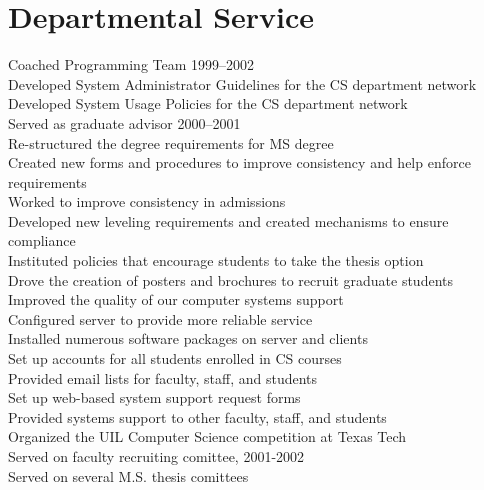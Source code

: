 \documentclass[11pt]{resume}
\begin{document}
\section{Departmental Service}{}
{Coached Programming Team 1999--2002\\
  Developed System Administrator Guidelines for the CS department network\\
  Developed System Usage Policies for the CS department network\\
 Served as graduate advisor 2000--2001\\
\hspace*{1em} Re-structured the degree requirements for MS degree\\
\hspace*{1em} Created new forms and procedures to improve consistency and help enforce requirements\\
\hspace*{1em} Worked to improve consistency in admissions\\
\hspace*{1em} Developed new leveling requirements and created mechanisms to ensure compliance\\
\hspace*{1em} Instituted policies that encourage students to take the thesis option\\
\hspace*{1em} Drove the creation of posters and brochures to recruit graduate students\\
Improved the quality of our computer systems support\\
\hspace*{1em} Configured server to provide more reliable service\\
\hspace*{1em} Installed numerous software packages on server and clients\\
\hspace*{1em} Set up accounts for all students enrolled in CS courses\\
\hspace*{1em} Provided email lists for faculty, staff, and students\\
\hspace*{1em} Set up web-based system support request forms\\
\hspace*{1em} Provided systems support to other
faculty, staff, and students\\
Organized the UIL Computer Science competition at Texas Tech\\
Served on faculty recruiting comittee, 2001-2002\\
Served on several M.S. thesis comittees
}
\end{document}
